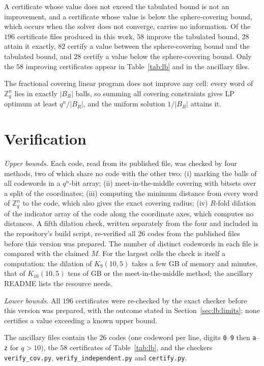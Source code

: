 \documentclass[11pt]{amsart}
\newcommand{\Kq}[3]{K_{#1}(#2,#3)}
\newcommand{\Zq}{\mathbb{Z}_q}
\begin{document}
A certificate whose value does not exceed the tabulated bound is not an
improvement, and a certificate whose value is below the sphere-covering
bound, which occurs when the solver does not converge, carries no
information. Of the $196$ certificate files produced in this work, $58$
improve the tabulated bound, $28$ attain it exactly, $82$ certify a value
between the sphere-covering bound and the tabulated bound, and $28$
certify a value below the sphere-covering bound. Only the $58$ improving
certificates appear in Table~\ref{tab:lb} and in the ancillary files.

The fractional covering linear program does not improve any cell: every
word of $\Zq^n$ lies in exactly $|B_R|$ balls, so summing all covering
constraints gives LP optimum at least $q^n/|B_R|$, and the uniform solution
$1/|B_R|$ attains it.

\section{Verification}\label{sec:verify}

\emph{Upper bounds.} Each code, read from its published file, was checked
by four methods, two of which share no code with the other two: (i)
marking the balls of all codewords in a $q^n$-bit array; (ii)
meet-in-the-middle covering with bitsets over a split of the coordinates;
(iii) computing the minimum distance from every word of $\Zq^n$ to the
code, which also gives the exact covering radius; (iv) $R$-fold dilation
of the indicator array of the code along the coordinate axes, which
computes no distances. A fifth dilation check, written separately from the
four and included in the repository's build script, re-verified all $26$
codes from the published files before this version was prepared. The
number of distinct codewords in each file is compared with the claimed
$M$. For the largest cells the check is itself a computation: the dilation
of $\Kq{9}{10}{5}$ takes a few GB of memory and minutes, that of
$\Kq{10}{10}{5}$ tens of GB or the meet-in-the-middle method; the
ancillary README lists the resource needs.

\emph{Lower bounds.} All $196$ certificates were re-checked by the exact
checker before this version was prepared, with the outcome stated in
Section~\ref{sec:lb:limits}; none certifies a value exceeding a known
upper bound.

The ancillary files contain the $26$ codes (one codeword per line, digits
\texttt{0}--\texttt{9} then \texttt{a}--\texttt{z} for $q>10$), the $58$
certificates of Table~\ref{tab:lb}, and the checkers
\texttt{verify\_cov.py}, \texttt{verify\_independent.py} and
\texttt{certify.py}.
\end{document}
